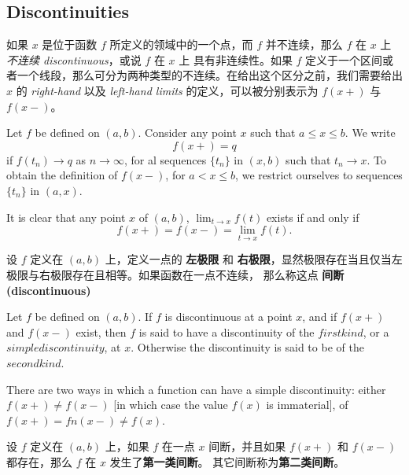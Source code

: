\documentclass[../poma-notes.tex]{subfiles}
\begin{document}
\subsection*{Discontinuities}

如果 $x$ 是位于函数 $f$ 所定义的领域中的一个点，而 $f$ 并不连续，那么 $f$ 在 $x$ 上 \textit{不连续 discontinuous}，或说 $f$ 在 $x$ 上
具有非连续性。如果 $f$ 定义于一个区间或者一个线段，那么可分为两种类型的不连续。在给出这个区分之前，我们需要给出 $x$ 的 \textit{right-hand}
以及 \textit{left-hand limits} 的定义，可以被分别表示为 $f(x+)$ 与 $f(x-)$。

\begin{definition}
  Let $f$ be defined on $(a, b)$. Consider any point $x$ such that $a \le x \le b$. We write
  \[
    f(x+) = q
  \]
  if $f(t_n) \to q$ as $n \to \infty$, for al sequences $\{t_n\}$ in $(x, b)$ such that $t_n \to x$. To obtain the definition
  of $f(x-)$, for $a < x \le b$, we restrict ourselves to sequences $\{t_n\}$ in $(a, x)$.

  It is clear that any point $x$ of $(a, b)$, $\lim_{t \to x} f(t)$ exists if and only if
  \[
    f(x+) = f(x-) = \lim_{t \to x} f(t).
  \]
\end{definition}

\begin{anote}
  设 $f$ 定义在 $(a, b)$ 上，定义一点的 \textbf{左极限} 和 \textbf{右极限}，显然极限存在当且仅当左极限与右极限存在且相等。如果函数在一点不连续，
  那么称这点 \textbf{间断 (discontinuous)}
\end{anote}

\begin{definition}
  Let $f$ be defined on $(a, b)$. If $f$ is discontinuous at a point $x$, and if $f(x+)$ and $f(x-)$ exist, then $f$ is said to
  have a discontinuity of the $first kind$, or a $simple discontinuity$, at $x$. Otherwise the discontinuity is said to be of
  the $second kind$.

  There are two ways in which a function can have a simple discontinuity: either $f(x+) \ne f(x-)$ [in which case the value
      $f(x)$ is immaterial], of $f(x+) = fn(x-) \ne f(x)$.
\end{definition}

\begin{anote}
  设 $f$ 定义在 $(a, b)$ 上，如果 $f$ 在一点 $x$ 间断，并且如果 $f(x+)$ 和 $f(x-)$ 都存在，那么 $f$ 在 $x$ 发生了\textbf{第一类间断}。
  其它间断称为\textbf{第二类间断}。
\end{anote}
\end{document}
